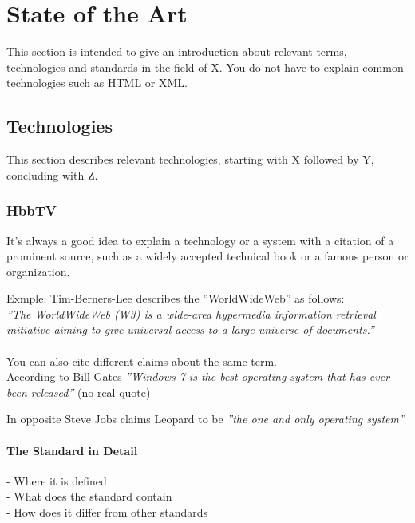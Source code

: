 \chapter{State of the Art\label{cha:chapter2}}

This section is intended to give an introduction about relevant terms, technologies
and standards in the field of X. You do not have to explain common technologies such
as HTML or XML.

\section{Technologies \label{sec:tech}}

This section describes relevant technologies, starting with X followed by Y, concluding with Z.

\subsection{HbbTV\label{sec:hbbtv}}

It's always a good idea to explain a technology or a system with a citation of a prominent
source, such as a widely accepted technical book or a famous person or organization.

Exmple: Tim-Berners-Lee describes the ''WorldWideWeb'' as follows:\\
\textit{''The WorldWideWeb (W3) is a wide-area hypermedia information retrieval initiative
aiming to give universal access to a large universe of documents.''} \cite{timwww}\\
\\
You can also cite different claims about the same term.\\

According to Bill Gates
\textit{''Windows 7 is the best operating system that has ever been released''} \cite{billgates} (no real quote)

In opposite Steve Jobs claims Leopard to be
\textit{''the one and only operating system''} \cite{stevejobs}

\subsubsection{The Standard in Detail\label{sec:hbbtvstandard}}

- Where it is defined\\
- What does the standard contain\\
- How does it differ from other standards

